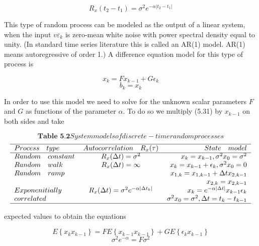 \[ R_{x}(t_{2}-t_{1})=\sigma^{2}e^{-\alpha|t_{2}-t_{1}|} \] 

This type of random process can be modeled as the output of a linear system, when the input $v\varepsilon_{k} $  is zero-mean white noise with power spectral density equal to unity. (In standard time series literature this is called an AR(1) model. AR(1) means autoregressive of order 1.) A difference equation model for this type of process is 

  \[  x_{k}=Fx_{k-1}+G\epsilon_{k}\]
  \begin{equation}\label{5.31}
  b_{k}=x_{k}
  \end{equation}
 

In order to use this model we need to solve for the unknown scalar parameters $F$ and $G$ as functions of the parameter $ \alpha $. To do so we multiply (5.31) by $ x_{k-1} $ on both sides and take

\[ \textbf{Table 5.2} System models of discrete-time random processes  \]
 \[ \begin{tabular}{lcr}
\hline
$ Process\quad type $ & $ Autocorrelation\quad R_{x}(\tau) $ & $State\quad model $ \\
  \cline{1-3}
 $ Random \quad constant $ & $  R_{x}(\Delta t)=\sigma^{2}$ & $  x_{k}=x_{k-1},\sigma^{2}{x_{0}}=\sigma^{2}$\\
 $ Random \quad walk $&$  R_{x}(\Delta t)= \infty  $&$  x_{k}=x_{k-1}+\epsilon_{k},\sigma^{2}{x_{0}}=0$\\
 
 $ Random \quad ramp $ &$ \quad$&$  x_{1,k}=x_{1,k-1}+\Delta t x_{2,k-1}$\\
 
 $  \quad  $ &$ \quad$&$  x_{2,k}=x_{2,k-1} $\\
 
$  Exponenitially  $  & $ R_{x}(\Delta t)=\sigma^{2}e^{-\alpha|\Delta t_{k}|} $ & $ x_{k}=e^{-\alpha|\Delta t|}x_{k-1}\epsilon_{k}$\\
 	
 	$ correlated$ & $  \quad   $ & $ \sigma^{2}{x_{0}}=\sigma^{2},\Delta t = t_{k}-t_{k-1} $ \\
  
 	\hline
\end{tabular} \]      	  

expected values to obtain the equations

\[ E\left\lbrace x_{k}x_{k-1} \right\rbrace =FE\left\lbrace x_{k-1}x_{k-1}\right\rbrace +GE\left\lbrace \epsilon_{k}x_{k-1}\right\rbrace \]
\begin{equation}\label{5.32}
\sigma^{2}e^{-\alpha}=F\sigma^{2}
\end{equation}
 

